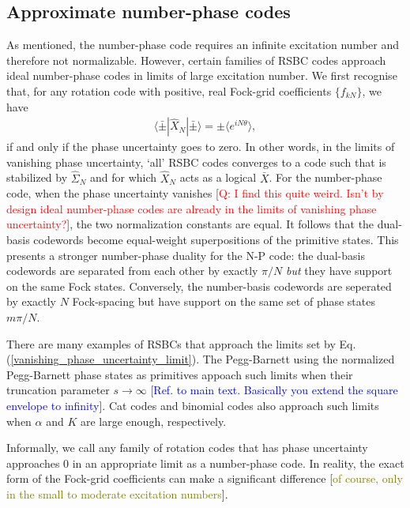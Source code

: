 \documentclass{article}
\begin{document}
\subsection{Approximate number-phase codes}
As mentioned, the number-phase code requires an infinite excitation number and therefore not normalizable. However, certain families of RSBC codes approach ideal number-phase codes in limits of large excitation number.
We first recognise that, for any rotation code with positive, real Fock-grid coefficients $\{f_{kN}\}$, we have 
\begin{align}\label{vanishing_phase_uncertainty_limit}
    \langle \bar{\pm} |\hat{X}_N| \bar{\pm}\rangle=\pm \langle e^{iN\theta}\rangle,
\end{align}
if and only if the phase uncertainty goes to zero. In other words, in the limits of vanishing phase uncertainty, `all' RSBC codes converges to a code such that is stabilized by $\hat{\Sigma}_N$ and for which $\hat{X}_N$ acts as a logical $\bar{X}$. 
For the number-phase code, when the phase uncertainty vanishes [\textcolor{red}{Q: I find this quite weird. Isn't by design ideal number-phase codes are already in the limits of vanishing phase uncertainty?}], the two normalization constants are equal. It follows that the dual-basis codewords become equal-weight superpositions of the primitive states. This presents a stronger number-phase duality for the N-P code: the dual-basis codewords are separated from each other by exactly $\pi/N$ \textit{but} they have support on the same Fock states. Conversely, the number-basis codewords are seperated by exactly $N$ Fock-spacing but have support on the same set of phase states $m\pi/N$.

There are many examples of RSBCs that approach the limits set by Eq. (\ref{vanishing_phase_uncertainty_limit}). The Pegg-Barnett using the normalized Pegg-Barnett phase states as primitives appoach such limits when their truncation parameter $s\to\infty$ [\textcolor{blue}{Ref. to main text. Basically you extend the square envelope to infinity}].  Cat codes and binomial codes also approach such limits when $\alpha$ and $K$ are large enough, respectively. 

Informally, we call any family of rotation codes that has phase uncertainty approaches $0$ in an appropriate limit as a number-phase code. In reality, the exact form of the Fock-grid coefficients can make a significant difference [\textcolor{olive}{of course, only in the small to moderate excitation numbers}]. 
\end{document}
